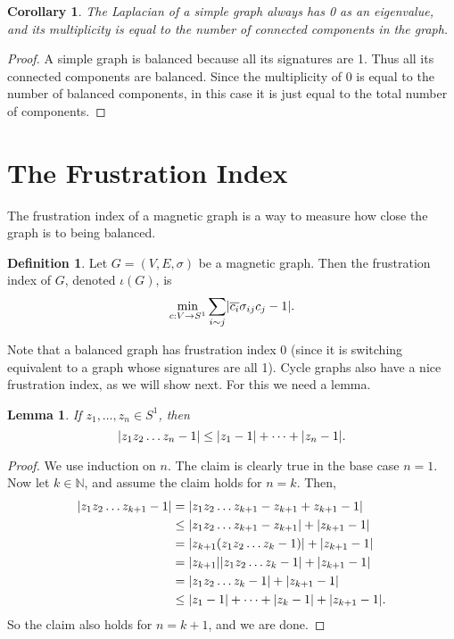 \documentclass[12pt]{article}
\newtheorem{corollary}[thm]{Corollary}
\newtheorem{lem}[thm]{Lemma}
\theoremstyle{definition}
\newtheorem{defn}[thm]{Definition}
\newcommand{\N}{\mathbb N}
\DeclarePairedDelimiter\abs{\lvert}{\rvert}
\begin{document}
\begin{corollary}
The Laplacian of a simple graph always has 0 as an eigenvalue, and its multiplicity is equal to the number of connected components in the graph.
\end{corollary}
\begin{proof}
A simple graph is balanced because all its signatures are 1. Thus all its connected components are balanced. Since the multiplicity of 0 is equal to the number of balanced components, in this case it is just equal to the total number of components.
\end{proof}

\section{The Frustration Index}
The frustration index of a magnetic graph is a way to measure how close the graph is to being balanced.

\begin{defn}\label{defn: frustration index}
Let $G = (V, E, \sigma)$ be a magnetic graph. Then the frustration index of $G$, denoted $\iota(G)$, is 
$$
\min_{c: V \rightarrow S^1}
\sum_{i \sim j} 
\abs*{\overline{c_i} \sigma_{ij} c_j - 1}.
$$
\end{defn}

Note that a balanced graph has frustration index 0 (since it is switching equivalent to a graph whose signatures are all 1). Cycle graphs also have a nice frustration index, as we will show next. For this we need a lemma.

\begin{lem}\label{lemma for cycle frustration}
If $z_1, \dots, z_n \in S^1$, then
$$
\abs*{z_1 z_2 \dots z_n - 1} \leq \abs*{z_1 - 1} + \dots + \abs*{z_n - 1}.
$$
\end{lem}
\begin{proof}
We use induction on $n$. The claim is clearly true in the base case $n = 1$. Now let $k \in \N$, and assume the claim holds for $n = k$. Then,
\begin{align*}
\abs*{z_1 z_2 \dots z_{k+1} - 1}
&= \abs*{z_1 z_2 \dots z_{k+1} - z_{k+1} + z_{k+1} - 1} \\
&\leq \abs*{z_1 z_2 \dots z_{k+1} - z_{k+1}} + \abs*{z_{k+1} - 1}\\
&= \abs*{z_{k+1}(z_1 z_2 \dots z_{k} - 1)} + \abs*{z_{k+1} - 1} \\
&= \abs*{z_{k+1}} \abs*{z_1 z_2 \dots z_{k} - 1} + \abs*{z_{k+1} - 1} \\
&= \abs*{z_1 z_2 \dots z_{k} - 1} + \abs*{z_{k+1} - 1} \\
&\leq \abs*{z_1 - 1} + \dots + \abs*{z_k - 1} + \abs*{z_{k+1} - 1}.
\end{align*}
So the claim also holds for $n = k + 1$, and we are done.
\end{proof}
\end{document}
